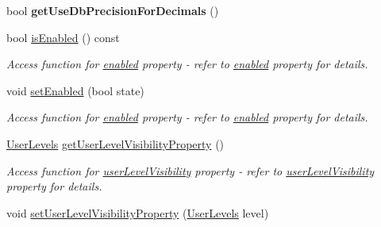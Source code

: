 \begin{DoxyCompactItemize}
\item 
\hypertarget{classQESpinBox_a382cb582dcc392885cabf4a7225c13d0}{
bool {\bfseries getUseDbPrecisionForDecimals} ()}
\label{classQESpinBox_a382cb582dcc392885cabf4a7225c13d0}

\item 
\hypertarget{classQESpinBox_aa39d173c187eb566a99dcfb0514c2b75}{
bool \hyperlink{classQESpinBox_aa39d173c187eb566a99dcfb0514c2b75}{isEnabled} () const }
\label{classQESpinBox_aa39d173c187eb566a99dcfb0514c2b75}

\begin{DoxyCompactList}\small\item\em Access function for \hyperlink{classQESpinBox_a3b294d83e54061c1cccb9a5dffcc0ae9}{enabled} property -\/ refer to \hyperlink{classQESpinBox_a3b294d83e54061c1cccb9a5dffcc0ae9}{enabled} property for details. \end{DoxyCompactList}\item 
\hypertarget{classQESpinBox_a9f31e4ea1ec291449d8f0693aa1fb129}{
void \hyperlink{classQESpinBox_a9f31e4ea1ec291449d8f0693aa1fb129}{setEnabled} (bool state)}
\label{classQESpinBox_a9f31e4ea1ec291449d8f0693aa1fb129}

\begin{DoxyCompactList}\small\item\em Access function for \hyperlink{classQESpinBox_a3b294d83e54061c1cccb9a5dffcc0ae9}{enabled} property -\/ refer to \hyperlink{classQESpinBox_a3b294d83e54061c1cccb9a5dffcc0ae9}{enabled} property for details. \end{DoxyCompactList}\item 
\hypertarget{classQESpinBox_a72d359f4ab5c018721ad43fddc53420a}{
\hyperlink{classQESpinBox_a27e69a31dc1ff8835542c057926b3eed}{UserLevels} \hyperlink{classQESpinBox_a72d359f4ab5c018721ad43fddc53420a}{getUserLevelVisibilityProperty} ()}
\label{classQESpinBox_a72d359f4ab5c018721ad43fddc53420a}

\begin{DoxyCompactList}\small\item\em Access function for \hyperlink{classQESpinBox_a36b8c4b73a3f918f967a45e370d53249}{userLevelVisibility} property -\/ refer to \hyperlink{classQESpinBox_a36b8c4b73a3f918f967a45e370d53249}{userLevelVisibility} property for details. \end{DoxyCompactList}\item 
\hypertarget{classQESpinBox_a6cb26d73dd3bfcec6d27ce4b99ad0207}{
void \hyperlink{classQESpinBox_a6cb26d73dd3bfcec6d27ce4b99ad0207}{setUserLevelVisibilityProperty} (\hyperlink{classQESpinBox_a27e69a31dc1ff8835542c057926b3eed}{UserLevels} level)}
\label{classQESpinBox_a6cb26d73dd3bfcec6d27ce4b99ad0207}


\end{DoxyCompactItemize}
